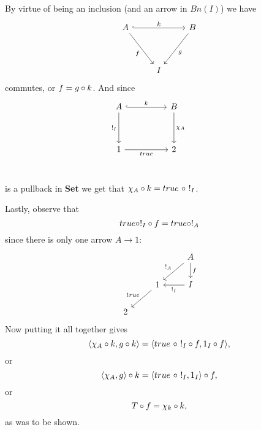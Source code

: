 \begin{exercise}
        By virtue of being an inclusion (and an arrow in $Bn(I)$) we have
        \[\begin{tikzcd}
            {A} && {B} \\
            \\
            & {I}
            \arrow["{k}", from=1-1, to=1-3, hook]
            \arrow["{g}", from=1-3, to=3-2]
            \arrow["{f}"', from=1-1, to=3-2]
        \end{tikzcd}\]
        commutes, or $f = g\circ k$.
        And since
        \[\begin{tikzcd}
            {A} && {B} \\
            \\
            {1} && {2} \\
            &&& {}
            \arrow["{k}", from=1-1, to=1-3, hook]
            \arrow["{\chi_A}", from=1-3, to=3-3]
            \arrow["{true}"', from=3-1, to=3-3]
            \arrow["{!_I}"', from=1-1, to=3-1]
        \end{tikzcd}\]
        is a pullback in \textbf{Set} we get that $\chi_A \o k = true \ \o \ !_I$.

        Lastly, observe that
        $$true \circ !_I \circ f = true \circ !_A$$
        since there is only one arrow $A \to 1$:
        \[\begin{tikzcd}
            && {A} \\
            & {1} & {I} \\
            {2}
            \arrow["{f}", from=1-3, to=2-3]
            \arrow["{!_I}", from=2-3, to=2-2]
            \arrow["{!_A}"', from=1-3, to=2-2]
            \arrow["{true}"', from=2-2, to=3-1]
        \end{tikzcd}\]
        Now putting it all together gives
        $$\langle \chi_A \circ k, g \circ k \rangle = \langle true \ \circ \ !_I \circ f, 1_I \circ f \rangle,$$
        or 
        $$\langle \chi_A , g  \rangle \o k = \langle true \ \o \ !_I, 1_I \rangle \o f,$$
        or 
        $$T\circ f = \chi_k \circ k,$$
        as was to be shown.

    \end{exercise}